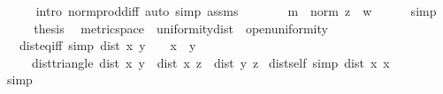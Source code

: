 \begin{isabellebody}
\ \ \ \ \isamarkupfalse%
\ {\isacharparenleft}{\kern0pt}intro\ norm{\isacharunderscore}{\kern0pt}prod{\isacharunderscore}{\kern0pt}diff{\isacharparenright}{\kern0pt}\ {\isacharparenleft}{\kern0pt}auto\ simp{\isacharcolon}{\kern0pt}\ assms{\isacharparenright}{\kern0pt}\isanewline
\ \ \isamarkupfalse%
\ \isamarkupfalse%
\ {\isachardoublequoteopen}{\isasymdots}\ {\isacharequal}{\kern0pt}\ m\ {\isacharasterisk}{\kern0pt}\ norm\ {\isacharparenleft}{\kern0pt}z\ {\isacharminus}{\kern0pt}\ w{\isacharparenright}{\kern0pt}{\isachardoublequoteclose}\isanewline
\ \ \ \ \isamarkupfalse%
\ simp\isanewline
\ \ \isamarkupfalse%
\ \isamarkupfalse%
\ {\isacharquery}{\kern0pt}thesis\ \isacommand{{\isachardot}{\kern0pt}}\isamarkupfalse%
\isanewline
{}\isamarkupfalse%
%
\endisatagproof
{\isafoldproof}%
%
\isadelimproof
%
\endisadelimproof
%
\isadelimdocument
%
\endisadelimdocument
%
\isatagdocument
%
\isamarkuptrue%
%
\endisatagdocument
{\isafolddocument}%
%
\isadelimdocument
%
\endisadelimdocument
{}\isamarkupfalse%
\ metric{\isacharunderscore}{\kern0pt}space\ {\isacharequal}{\kern0pt}\ uniformity{\isacharunderscore}{\kern0pt}dist\ {\isacharplus}{\kern0pt}\ open{\isacharunderscore}{\kern0pt}uniformity\ {\isacharplus}{\kern0pt}\isanewline
\ \ \ dist{\isacharunderscore}{\kern0pt}eq{\isacharunderscore}{\kern0pt}{}{\isacharunderscore}{\kern0pt}iff\ {\isacharbrackleft}{\kern0pt}simp{\isacharbrackright}{\kern0pt}{\isacharcolon}{\kern0pt}\ {\isachardoublequoteopen}dist\ x\ y\ {\isacharequal}{\kern0pt}\ {}\ {\isasymlongleftrightarrow}\ x\ {\isacharequal}{\kern0pt}\ y{\isachardoublequoteclose}\isanewline
\ \ \ \ \ dist{\isacharunderscore}{\kern0pt}triangle{}{\isacharcolon}{\kern0pt}\ {\isachardoublequoteopen}dist\ x\ y\ {\isasymle}\ dist\ x\ z\ {\isacharplus}{\kern0pt}\ dist\ y\ z{\isachardoublequoteclose}\isanewline
{}\isanewline
\isanewline
{}\isamarkupfalse%
\ dist{\isacharunderscore}{\kern0pt}self\ {\isacharbrackleft}{\kern0pt}simp{\isacharbrackright}{\kern0pt}{\isacharcolon}{\kern0pt}\ {\isachardoublequoteopen}dist\ x\ x\ {\isacharequal}{\kern0pt}\ {}{\isachardoublequoteclose}\isanewline
%
\isadelimproof
\ \ %
\endisadelimproof
%
\isatagproof
{}\isamarkupfalse%
\ simp%
\endisatagproof
{\isafoldproof}%
%
\isadelimproof
\isanewline
%
\endisadelimproof
\isanewline
{}\isamarkupfalse%

\end{isabellebody}
